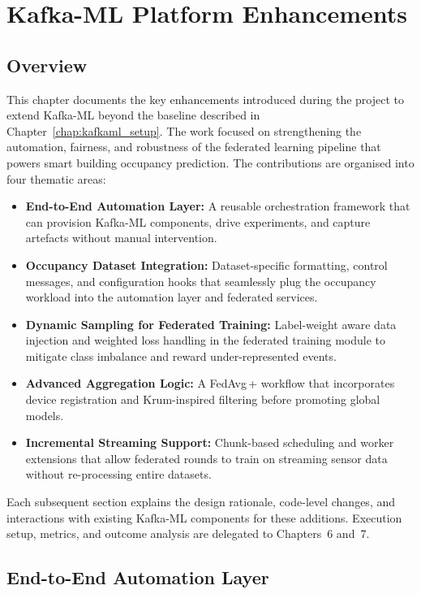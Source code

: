 \chapter{Kafka-ML Platform Enhancements}

\section{Overview}

This chapter documents the key enhancements introduced during the project to extend Kafka-ML beyond the baseline described in Chapter~\ref{chap:kafkaml_setup}. The work focused on strengthening the automation, fairness, and robustness of the federated learning pipeline that powers smart building occupancy prediction. The contributions are organised into four thematic areas:

\begin{itemize}
    \item \textbf{End-to-End Automation Layer:} A reusable orchestration framework that can provision Kafka-ML components, drive experiments, and capture artefacts without manual intervention.
    \item \textbf{Occupancy Dataset Integration:} Dataset-specific formatting, control messages, and configuration hooks that seamlessly plug the occupancy workload into the automation layer and federated services.
    \item \textbf{Dynamic Sampling for Federated Training:} Label-weight aware data injection and weighted loss handling in the federated training module to mitigate class imbalance and reward under-represented events.
    \item \textbf{Advanced Aggregation Logic:} A FedAvg\,+ workflow that incorporates device registration and Krum-inspired filtering before promoting global models.
    \item \textbf{Incremental Streaming Support:} Chunk-based scheduling and worker extensions that allow federated rounds to train on streaming sensor data without re-processing entire datasets.
\end{itemize}

Each subsequent section explains the design rationale, code-level changes, and interactions with existing Kafka-ML components for these additions. Execution setup, metrics, and outcome analysis are delegated to Chapters~6 and~7.

\section{End-to-End Automation Layer}
\label{sec:automation_layer}

